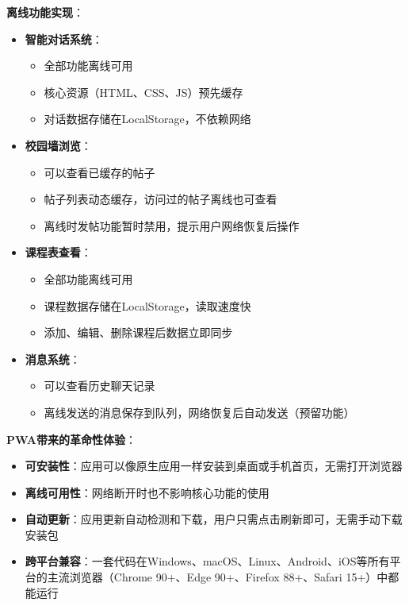 \documentclass[12pt,a4paper]{article}
\begin{document}
\textbf{离线功能实现}：
\begin{itemize}
    \item \textbf{智能对话系统}：
        \begin{itemize}
            \item 全部功能离线可用
            \item 核心资源（HTML、CSS、JS）预先缓存
            \item 对话数据存储在LocalStorage，不依赖网络
        \end{itemize}
    \item \textbf{校园墙浏览}：
        \begin{itemize}
            \item 可以查看已缓存的帖子
            \item 帖子列表动态缓存，访问过的帖子离线也可查看
            \item 离线时发帖功能暂时禁用，提示用户网络恢复后操作
        \end{itemize}
    \item \textbf{课程表查看}：
        \begin{itemize}
            \item 全部功能离线可用
            \item 课程数据存储在LocalStorage，读取速度快
            \item 添加、编辑、删除课程后数据立即同步
        \end{itemize}
    \item \textbf{消息系统}：
        \begin{itemize}
            \item 可以查看历史聊天记录
            \item 离线发送的消息保存到队列，网络恢复后自动发送（预留功能）
        \end{itemize}
\end{itemize}

\textbf{PWA带来的革命性体验}：
\begin{itemize}
    \item \textbf{可安装性}：应用可以像原生应用一样安装到桌面或手机首页，无需打开浏览器
    \item \textbf{离线可用性}：网络断开时也不影响核心功能的使用
    \item \textbf{自动更新}：应用更新自动检测和下载，用户只需点击刷新即可，无需手动下载安装包
    \item \textbf{跨平台兼容}：一套代码在Windows、macOS、Linux、Android、iOS等所有平台的主流浏览器（Chrome 90+、Edge 90+、Firefox 88+、Safari 15+）中都能运行
\end{itemize}
\end{document}
